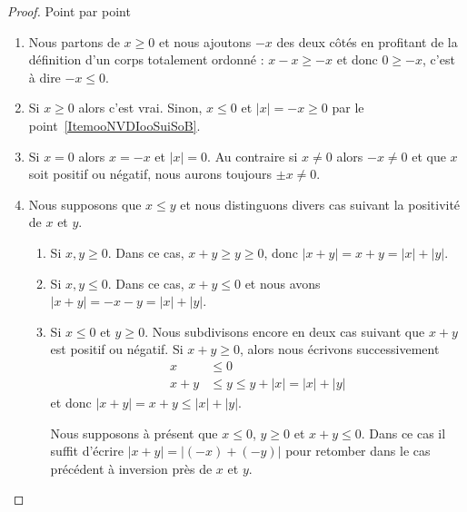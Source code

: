 \begin{proof}
    Point par point
    \begin{enumerate}
        \item
            Nous partons de \( x\geq 0\) et nous ajoutons \( -x\) des deux côtés en profitant de la définition d'un corps totalement ordonné : \( x-x\geq -x\) et donc \( 0\geq-x\), c'est à dire \( -x\leq 0\).
        \item
            Si \( x\geq 0\) alors c'est vrai. Sinon, \( x\leq 0\) et \( | x |=-x\geq 0\) par le point~\ref{ItemooNVDIooSuiSoB}.
        \item
            Si \( x=0\) alors \( x=-x\) et \( | x |=0\). Au contraire si \(x\neq 0\) alors \( -x\neq 0\) et que \( x\) soit positif ou négatif, nous aurons toujours \( \pm x\neq 0\).
        \item
            Nous supposons que \( x\leq y\) et nous distinguons divers cas suivant la positivité de \( x\) et \( y\).
            \begin{enumerate}
                \item
                    Si \( x,y\geq 0\). Dans ce cas, \( x+y\geq y\geq 0\), donc \( | x+y |=x+y=| x |+| y |\).
                \item
                    Si \( x,y\leq 0\). Dans ce cas, \( x+y\leq 0\) et nous avons \( | x+y |=-x-y=| x |+| y |\).
                \item
                    Si \( x\leq 0\) et \( y\geq 0\). Nous subdivisons encore en deux cas suivant que \( x+y\) est positif ou négatif. Si \( x+y\geq 0\), alors nous écrivons successivement
                    \begin{subequations}
                        \begin{align}
                            x&\leq 0\\
                            x+y&\leq y\leq y+| x |=| x |+| y |
                        \end{align}
                    \end{subequations}
                    et donc \( | x+y |=x+y\leq | x |+| y |\).

                    Nous supposons à présent que \( x\leq 0\), \( y\geq 0\) et \( x+y\leq 0\). Dans ce cas il suffit d'écrire \( | x+y |=| (-x)+(-y) |\) pour retomber dans le cas précédent à inversion près de \( x\) et \( y\).
            \end{enumerate}
    \end{enumerate}
\end{proof}

